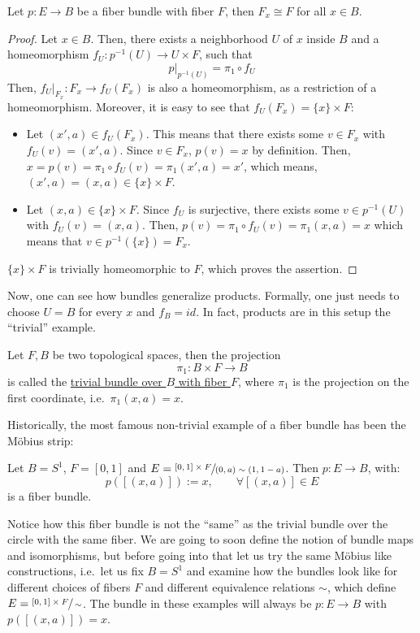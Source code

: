 \begin{proposition}\label{prop:same_fiber} Let $p:E\to B$ be a fiber bundle with fiber $F$, then $F_x\cong F$ for all $x\in B$.
\end{proposition}
\begin{proof}
Let $x\in B$. Then, there exists a neighborhood $U$ of $x$ inside $B$ and a homeomorphism $f_U:p^{-1}(U)\to U\times F$, such that
\[p|_{p^{-1}(U)}=\pi_1\circ f_U\]
Then, $f_U|_{F_x}:F_x\to f_U(F_x)$ is also a homeomorphism, as a restriction of a homeomorphism. Moreover, it is easy to see that $f_U(F_x)=\{x\}\times F$:
\begin{itemize}
\item Let $(x',a)\in f_U(F_x)$. This means that there exists some $v\in F_x$ with $f_U(v)=(x',a)$. Since $v\in F_x$, $p(v)=x$ by definition. Then, $x=p(v)=\pi_1\circ f_U(v)=\pi_1(x',a)=x'$, which means, $(x',a)=(x,a)\in\{x\}\times F$.
\item Let $(x,a)\in\{x\}\times F$. Since $f_U$ is surjective, there exists some $v\in p^{-1}(U)$ with $f_U(v)=(x,a)$. Then, $p(v)=\pi_1\circ f_U(v)=\pi_1(x,a)=x$ which means that $v\in p^{-1}(\{x\})=F_x$.
\end{itemize}
$\{x\}\times F$ is trivially homeomorphic to $F$, which proves the assertion.
\end{proof}

Now, one can see how bundles generalize products. Formally, one just needs to choose $U=B$ for every $x$ and $f_B=id$. In fact, products are in this setup the ``trivial'' example.
\begin{definition} Let $F, B$ be two topological spaces, then the projection
\[\pi_1:B\times F\to B\]
is called the \ul{trivial bundle over $B$ with fiber $F$}, where $\pi_1$ is the projection on the first coordinate, i.e.\ $\pi_1(x,a)=x$.
\end{definition}

Historically, the most famous non-trivial example of a fiber bundle has been the M\"obius strip:
\begin{example} Let $B=S^1$, $F=[0,1]$ and $E=\sfrac{[0,1]\times F}{(0,a)\sim(1,1-a)}$. Then $p:E\to B$, with:
\[p([(x,a)]):= x,\qquad\forall [(x,a)]\in E\]
is a fiber bundle.
\end{example}
Notice how this fiber bundle is not the ``same'' as the trivial bundle over the circle with the same fiber. We are going to soon define the notion of bundle maps and isomorphisms, but before going into that let us try the same M\"obius like constructions, i.e.\ let us fix $B=S^1$ and examine how the bundles look like for different choices of fibers $F$ and different equivalence relations $\sim$, which define $E=\sfrac{[0,1]\times F}{\sim}$. The bundle in these examples will always be $p:E\to B$ with $p([(x,a)])=x$.

